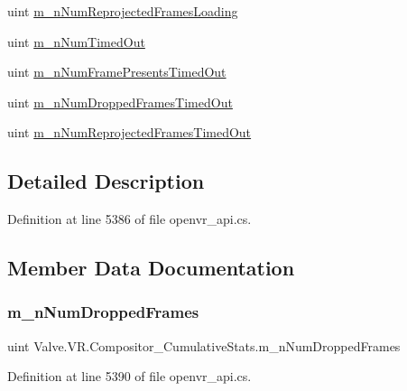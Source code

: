 \begin{DoxyCompactItemize}
\item 
uint \mbox{\hyperlink{struct_valve_1_1_v_r_1_1_compositor___cumulative_stats_ad0b267ad2116401b269dc3e7c3f5617f}{m\+\_\+n\+Num\+Reprojected\+Frames\+Loading}}
\item 
uint \mbox{\hyperlink{struct_valve_1_1_v_r_1_1_compositor___cumulative_stats_abf24e04016fc4f3e15aae9e2acba7573}{m\+\_\+n\+Num\+Timed\+Out}}
\item 
uint \mbox{\hyperlink{struct_valve_1_1_v_r_1_1_compositor___cumulative_stats_a11c798610f91ae3d8ac5f95f00f2e010}{m\+\_\+n\+Num\+Frame\+Presents\+Timed\+Out}}
\item 
uint \mbox{\hyperlink{struct_valve_1_1_v_r_1_1_compositor___cumulative_stats_a4a277f5dd370529d485fe16c8b5926c5}{m\+\_\+n\+Num\+Dropped\+Frames\+Timed\+Out}}
\item 
uint \mbox{\hyperlink{struct_valve_1_1_v_r_1_1_compositor___cumulative_stats_a1fa8efae2035088bf3facb11d881e4b4}{m\+\_\+n\+Num\+Reprojected\+Frames\+Timed\+Out}}
\end{DoxyCompactItemize}


\subsection{Detailed Description}


Definition at line 5386 of file openvr\+\_\+api.\+cs.



\subsection{Member Data Documentation}
\mbox{\label{struct_valve_1_1_v_r_1_1_compositor___cumulative_stats_a590238b050ef035ac7fa8db3711df938}} 
\subsubsection{\texorpdfstring{m\_nNumDroppedFrames}{m\_nNumDroppedFrames}}
{\footnotesize\ttfamily uint Valve.\+V\+R.\+Compositor\+\_\+\+Cumulative\+Stats.\+m\+\_\+n\+Num\+Dropped\+Frames}



Definition at line 5390 of file openvr\+\_\+api.\+cs.

